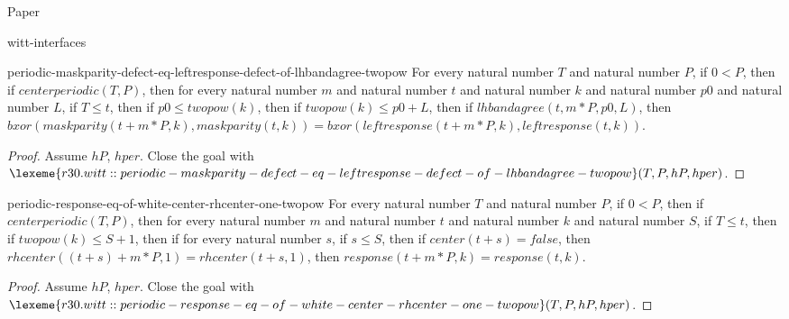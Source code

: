 \begin{lexlean}{Paper}
\begin{section}{witt-interfaces}
  \begin{theorem}{periodic-maskparity-defect-eq-leftresponse-defect-of-lhbandagree-twopow}
  For every natural number \(T\) and natural number \(P\), if \(0 < P\), then if \(centerperiodic(T, P)\), then for every natural number \(m\) and natural number \(t\) and natural number \(k\) and natural number \(p0\) and natural number \(L\), if \(T ≤ t\), then if \(p0 ≤ twopow(k)\), then if \(twopow(k) ≤ p0 + L\), then if \(lhbandagree(t, m * P, p0, L)\), then \(bxor(maskparity(t + m * P, k), maskparity(t, k)) = bxor(leftresponse(t + m * P, k), leftresponse(t, k))\).
  \begin{proof}
  Assume \(hP\), \(hper\).
  Close the goal with \(\lexeme{r30.witt::periodic-maskparity-defect-eq-leftresponse-defect-of-lhbandagree-twopow}(T, P, hP, hper)\).
  \end{proof}
  \end{theorem}

  \begin{theorem}{periodic-response-eq-of-white-center-rhcenter-one-twopow}
  For every natural number \(T\) and natural number \(P\), if \(0 < P\), then if \(centerperiodic(T, P)\), then for every natural number \(m\) and natural number \(t\) and natural number \(k\) and natural number \(S\), if \(T ≤ t\), then if \(twopow(k) ≤ S + 1\), then if for every natural number \(s\), if \(s ≤ S\), then if \(center(t + s) = false\), then \(rhcenter((t + s) + m * P, 1) = rhcenter(t + s, 1)\), then \(response(t + m * P, k) = response(t, k)\).
  \begin{proof}
  Assume \(hP\), \(hper\).
  Close the goal with \(\lexeme{r30.witt::periodic-response-eq-of-white-center-rhcenter-one-twopow}(T, P, hP, hper)\).
  \end{proof}
  \end{theorem}


\end{section}
\end{lexlean}
